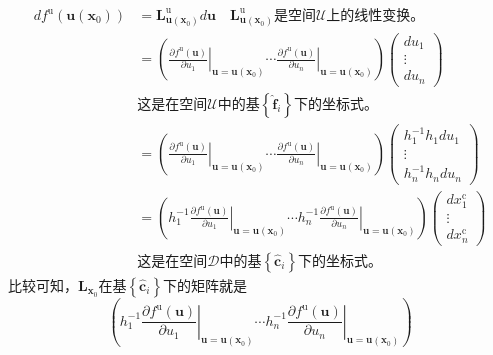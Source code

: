 \documentclass[main.tex]{subfiles}
\begin{document}
\begin{align*}
df^\mathrm{u}\left(\mathbf{u}\left(\mathbf{x}_0\right)\right)&=\mathbf{L}_{\mathbf{u}\left(\mathbf{x}_0\right)}^\mathrm{u}d\mathbf{u}\quad\text{$\mathbf{L}_{\mathbf{u}\left(\mathbf{x}_0\right)}^\mathrm{u}$是空间$\mathcal{U}$上的线性变换。}\\
&=\left(\left.\frac{\partial f^\mathrm{u}\left(\mathbf{u}\right)}{\partial u_1}\right|_{\mathbf{u}=\mathbf{u}\left(\mathbf{x}_0\right)}\cdots\left.\frac{\partial f^\mathrm{u}\left(\mathbf{u}\right)}{\partial u_n}\right|_{\mathbf{u}=\mathbf{u}\left(\mathbf{x}_0\right)}\right)\left(\begin{array}{c}du_1\\\vdots\\du_n\end{array}\right)\\
&\text{这是在空间$\mathcal{U}$中的基$\left\{\mathbf{\hat{f}}_i\right\}$下的坐标式。}\\
&=\left(\left.\frac{\partial f^\mathrm{u}\left(\mathbf{u}\right)}{\partial u_1}\right|_{\mathbf{u}=\mathbf{u}\left(\mathbf{x}_0\right)}\cdots\left.\frac{\partial f^\mathrm{u}\left(\mathbf{u}\right)}{\partial u_n}\right|_{\mathbf{u}=\mathbf{u}\left(\mathbf{x}_0\right)}\right)\left(\begin{array}{c}h_1^{-1}h_1du_1\\\vdots\\h_n^{-1}h_ndu_n\end{array}\right)\\
&=\left(h_1^{-1}\left.\frac{\partial f^\mathrm{u}\left(\mathbf{u}\right)}{\partial u_1}\right|_{\mathbf{u}=\mathbf{u}\left(\mathbf{x}_0\right)}\cdots h_n^{-1}\left.\frac{\partial f^\mathrm{u}\left(\mathbf{u}\right)}{\partial u_n}\right|_{\mathbf{u}=\mathbf{u}\left(\mathbf{x}_0\right)}\right)\left(\begin{array}{c}dx_1^\mathrm{c}\\\vdots\\dx_n^\mathrm{c}\end{array}\right)\\
&\text{这是在空间$\mathcal{D}$中的基$\left\{\mathbf{\hat{c}}_i\right\}$下的坐标式。}
\end{align*}
比较可知，$\mathbf{L}_{\mathbf{x}_0}$在基$\left\{\mathbf{\hat{c}}_i\right\}$下的矩阵就是
\[\left(h_1^{-1}\left.\frac{\partial f^\mathrm{u}\left(\mathbf{u}\right)}{\partial u_1}\right|_{\mathbf{u}=\mathbf{u}\left(\mathbf{x}_0\right)}\cdots h_n^{-1}\left.\frac{\partial f^\mathrm{u}\left(\mathbf{u}\right)}{\partial u_n}\right|_{\mathbf{u}=\mathbf{u}\left(\mathbf{x}_0\right)}\right)\]
\end{document}
